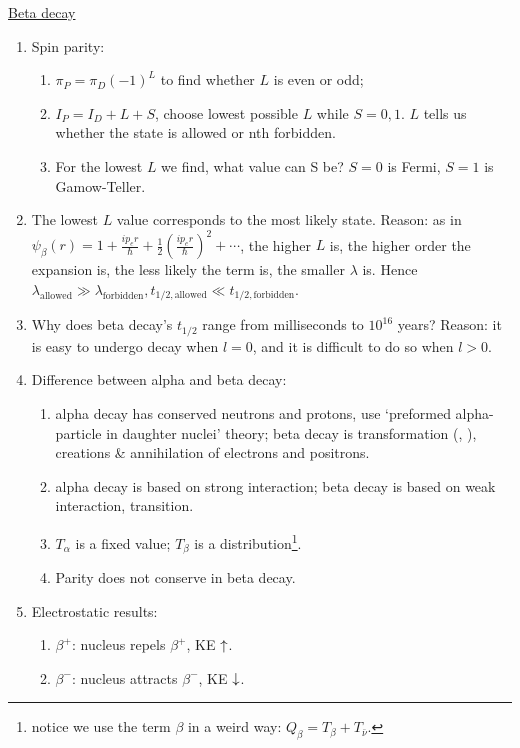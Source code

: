 \documentclass{school-22.101-notes}
\begin{document}
\clearpage
\uline{Beta decay}
\begin{enumerate}
\item Spin parity: 
    \begin{enumerate}
    \item $\pi_P = \pi_D (-1)^L$ to find whether $L$ is even or odd;
    \item $I_P = I_D + L + S$, choose lowest possible $L$ while $S = 0,1$. $L$ tells us whether the state is allowed or nth forbidden.
    \item For the lowest $L$ we find, what value can S be? $S=0$ is Fermi, $S=1$ is Gamow-Teller. 
    \end{enumerate}
\item The lowest $L$ value corresponds to the most likely state. Reason: as in $\psi_{\beta} (r) = 1 + \frac{i p_e r}{\hbar} + \frac{1}{2} \left( \frac{i p_e r}{\hbar} \right)^2 + \cdots$, the higher $L$ is, the higher order the expansion is, the less likely the term is, the smaller $\lambda$ is. Hence $\lambda_{\mathrm{allowed}} \gg \lambda_{\mathrm{forbidden}}, t_{1/2,\mathrm{allowed}} \ll t_{1/2,\mathrm{forbidden}}$. 
\item Why does beta decay's $t_{1/2}$ range from milliseconds to $10^{16}$ years? Reason: it is easy to undergo decay when $l=0$, and it is difficult to do so when $l>0$.     
\item Difference between alpha and beta decay: 
    \begin{enumerate}
    \item alpha decay has conserved neutrons and protons, use `preformed alpha-particle in daughter nuclei' theory; beta decay is transformation (, ), creations \& annihilation of electrons and positrons.
    \item alpha decay is based on strong interaction; beta decay is based on weak interaction, transition. 
    \item $T_{\alpha}$ is a fixed value; $T_{\beta}$ is a distribution\footnote{notice we use the term $\beta$ in a weird way: $Q_{\beta} = T_{\beta} + T_{\bar{\nu}}$.}. 
    \item Parity does not conserve in beta decay.
    \end{enumerate}
\item Electrostatic results: 
    \begin{enumerate}
    \item $\beta^+$: nucleus repels $\beta^+$, KE $\uparrow$.
    \item $\beta^-$: nucleus attracts $\beta^-$, KE $\downarrow$. 

\end{enumerate}
\end{enumerate}
\end{document}
